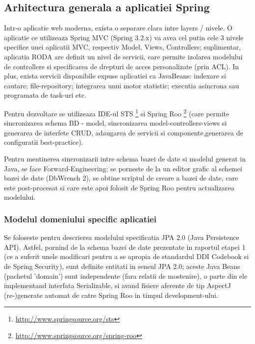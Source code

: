 \subsection{Arhitectura generala a aplicatiei Spring}

Intr-o aplicatie web moderna, exista o separare clara intre layers /
nivele. O aplicatie ce utilizeaza Spring MVC (Spring 3.2.x) va avea cel putin
cele 3 nivele specifice unei aplicatii MVC, respectiv Model, Views, Controllers; suplimentar,
aplicatia RODA are definit un nivel de servicii, care permite izolarea modelului
de controllere si specificarea de drepturi de acces personalizate (prin ACL). In
plus, exista servicii disponibile expuse aplicatiei ca JavaBeans: indexare si
cautare; file-repository; integrarea unui motor statistic; executia asincrona
sau programata de task-uri etc.


Pentru dezvoltare se utilizeaza IDE-ul STS
\footnote{\href{http://www.springsource.org/sts}{http://www.springsource.org/sts}}
si Spring Roo
\footnote{\href{http://www.springsource.org/spring-roo}{http://www.springsource.org/spring-roo}}
(care permite sincronizarea schema BD - model, sincronizarea model-controllers-views si generarea de
interfete CRUD, adaugarea de servicii si componente,generarea de configuratii
best-practice).

Pentru mentinerea sincronizarii intre schema bazei de date si modelul generat
in Java, se face Forward-Engineering; se porneste de la un editor grafic al
schemei bazei de date (DbWrench 2), se obtine scriptul de creare a bazei de
date, care este post-procesat si care este apoi folosit de Spring Roo pentru
actualizarea modelului.

\subsubsection{Modelul domeniului specific aplicatiei}
Se foloseste pentru descrierea modelului specificatia JPA 2.0 (Java Persistence
API).
Astfel, pornind de la schema bazei de date prezentate in raportul etapei 1 (ce
a suferit unele modificari pentru a se apropia de standardul DDI Codebook si
de Spring Security), sunt definite entitati in sensul JPA 2.0; aceste Java Beans
(pachetul 'domain') sunt independente (fara relatii de mostenire), o parte din ele
implementand interfata Serializable, si avand fisiere aferente de tip AspectJ
(re-)generate automat de catre Spring Roo in timpul development-ului.

